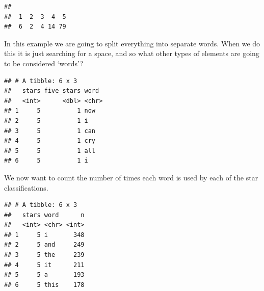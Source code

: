 \documentclass[
]{book}
\newenvironment{Shaded}{\begin{snugshade}}{\end{snugshade}}
\newcommand{\DataTypeTok}[1]{\textcolor[rgb]{0.13,0.29,0.53}{#1}}
\newcommand{\DecValTok}[1]{\textcolor[rgb]{0.00,0.00,0.81}{#1}}
\newcommand{\KeywordTok}[1]{\textcolor[rgb]{0.13,0.29,0.53}{\textbf{#1}}}
\newcommand{\NormalTok}[1]{#1}
\newcommand{\OperatorTok}[1]{\textcolor[rgb]{0.81,0.36,0.00}{\textbf{#1}}}
\newcommand{\OtherTok}[1]{\textcolor[rgb]{0.56,0.35,0.01}{#1}}
\newcommand{\StringTok}[1]{\textcolor[rgb]{0.31,0.60,0.02}{#1}}
\begin{document}
\begin{verbatim}
## 
##  1  2  3  4  5 
##  6  2  4 14 79
\end{verbatim}

In this example we are going to split everything into separate words. When we do this it is just searching for a space, and so what other types of elements are going to be considered `words'?

\begin{Shaded}
\end{Shaded}

\begin{verbatim}
## # A tibble: 6 x 3
##   stars five_stars word 
##   <int>      <dbl> <chr>
## 1     5          1 now  
## 2     5          1 i    
## 3     5          1 can  
## 4     5          1 cry  
## 5     5          1 all  
## 6     5          1 i
\end{verbatim}

We now want to count the number of times each word is used by each of the star classifications.

\begin{Shaded}
\end{Shaded}

\begin{verbatim}
## # A tibble: 6 x 3
##   stars word      n
##   <int> <chr> <int>
## 1     5 i       348
## 2     5 and     249
## 3     5 the     239
## 4     5 it      211
## 5     5 a       193
## 6     5 this    178
\end{verbatim}

\begin{Shaded}
\end{Shaded}
\end{document}
